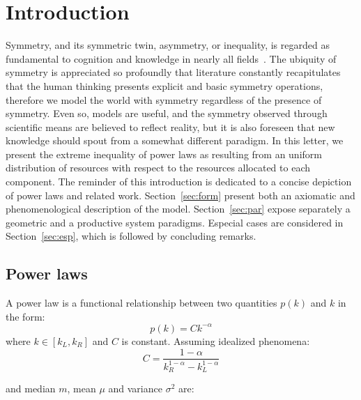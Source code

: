 \documentclass[a4paper, 11pt]{article} %
\begin{document}
\section{Introduction}
Symmetry, and its symmetric twin, asymmetry, or inequality,
is regarded as fundamental to cognition 
and knowledge in nearly all fields~\cite{deleuze,part}.
The ubiquity of symmetry is appreciated so profoundly that
literature constantly recapitulates that 
the human thinking presents
explicit and basic symmetry operations,
therefore we model the world with symmetry
regardless of the presence of symmetry.
Even so, models are useful, and the symmetry observed through scientific
means are believed to reflect reality, but it is also foreseen
that new knowledge should spout from a somewhat different paradigm.
In this letter, we present the extreme inequality
of power laws as resulting from
an uniform distribution of resources with
respect to the resources allocated 
to each component.
The reminder of this introduction is dedicated
to a concise depiction of power laws and related work.
Section~\ref{sec:form} present both an axiomatic and phenomenological
description of the model.
Section~\ref{sec:par} expose separately a geometric and a productive system
paradigms.
Especial cases are considered in Section~\ref{sec:esp},
which is followed by concluding remarks.

\subsection{Power laws}
A power law is a functional relationship between two quantities $p(k)$ and $k$ in the form:
\begin{equation}\label{eq:pow}
p(k) = Ck^{-\alpha}
\end{equation}
\noindent where $k\in [k_L,k_R]$
and $C$ is constant.
Assuming idealized phenomena:
\begin{equation}\label{eq:con}
C=\frac{1-\alpha}{k_R^{1-\alpha}-k_L^{1-\alpha}}
\end{equation}

\noindent and median $m$, mean $\mu$ and variance $\sigma^2$ are:
\end{document}

